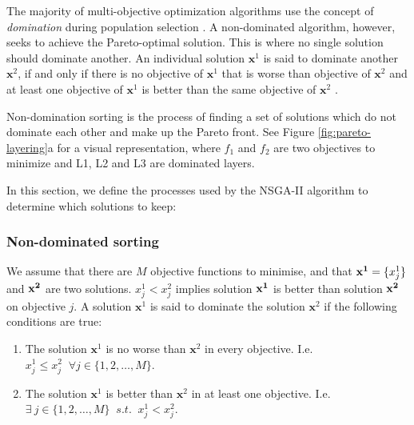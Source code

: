 The majority of multi-objective optimization algorithms use the concept of \emph{domination} during population selection \cite{Burke2014}. A non-dominated algorithm, however, seeks to achieve the Pareto-optimal solution. This is where no single solution should dominate another. An individual solution $\mathbf{x}^{1}$ is said to dominate another $\mathbf{x}^{2}$, if and only if there is no objective of $\mathbf{x}^{1}$ that is worse than objective of $\mathbf{x}^{2}$ and at least one objective of $\mathbf{x}^{1}$ is better than the same objective of $\mathbf{x}^{2}$ \cite{Bao2017}. 


Non-domination sorting is the process of finding a set of solutions which do not dominate each other and make up the Pareto front. See Figure \ref{fig:pareto-layering}a for a visual representation, where $f_1$ and $f_2$ are two objectives to minimize and L1, L2 and L3 are dominated layers.


In this section, we define the processes used by the NSGA-II algorithm to determine which solutions to keep:
\subsubsection{Non-dominated sorting}
We assume that there are $M$ objective functions to minimise, and that ${\bf x^{1}} = \{x_j^{1}\}$ and $\bf x^{2}$ are two solutions. $x_j^{1}<x_j^{2}$ implies solution $\bf x^{1}$ is better than solution $\bf x^{2}$ on objective $j$. A solution $\mathbf{x}^{1}$ is said to dominate the solution $\mathbf{x}^{2}$ if the following conditions are true:
\begin{enumerate}
	\item The solution $\mathbf{x}^{1}$ is no worse than $\mathbf{x}^{2}$ in every objective. I.e. $x^{1}_j \leq x^{2}_j \;\;  \forall j \in\{1,2,\ldots,M\}$.
	\item The solution $\mathbf{x}^{1}$ is better than $\mathbf{x}^{2}$ in at least one objective. I.e. $\exists\  {j}\in \{ 1,2,\ldots,M\} \;\; s.t. \;\;x^{1}_j < x^{2}_j$.
\end{enumerate}



